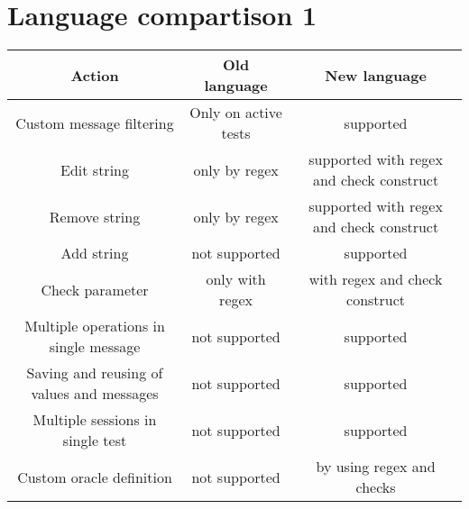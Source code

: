 \chapter{Language compartison 1}

\begin{center}
    \begin{tabular}{ |c|c|c| }
        \hline
        Action                                    & Old language         & New language                             \\
        \hline\hline
        Custom message filtering                  & Only on active tests & supported                                \\
        Edit string                               & only by regex        & supported with regex and check construct \\
        Remove string                             & only by regex        & supported with regex and check construct \\
        Add string                                & not supported        & supported                                \\
        Check parameter                           & only with regex      & with regex and check construct           \\
        Multiple operations in single message     & not supported        & supported                                \\
        Saving and reusing of values and messages & not supported        & supported                                \\
        Multiple sessions in single test          & not supported        & supported                                \\
        Custom oracle definition                  & not supported        & by using regex and checks                \\
        \hline
    \end{tabular}
\end{center}


